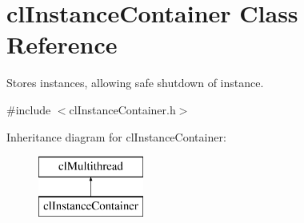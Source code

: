 \hypertarget{classcl_instance_container}{
\section{clInstanceContainer Class Reference}
\label{classcl_instance_container}
}


Stores instances, allowing safe shutdown of instance.  




{\ttfamily \#include $<$clInstanceContainer.h$>$}

Inheritance diagram for clInstanceContainer:\begin{figure}[H]
\begin{center}
\leavevmode
\includegraphics[height=2.000000cm]{classcl_instance_container}
\end{center}
\end{figure}
